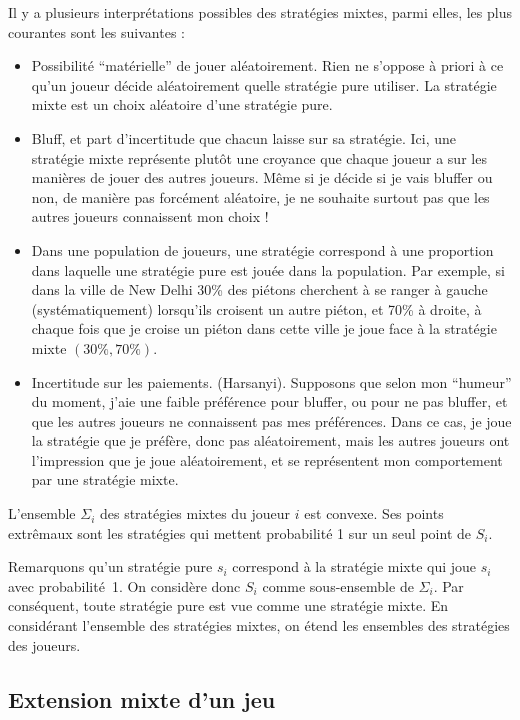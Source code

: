 Il y a plusieurs interprétations possibles des stratégies mixtes,
parmi elles, les plus courantes sont les suivantes :
\begin{itemize}
\item Possibilit\'e ``mat\'erielle'' de jouer al\'eatoirement.
Rien ne s'oppose à priori à ce qu'un joueur décide aléatoirement
quelle stratégie pure utiliser. La stratégie mixte est un choix
aléatoire d'une stratégie pure.%
\item Bluff, et part d'incertitude que chacun laisse sur sa
strat\'egie. Ici, une stratégie mixte représente plutôt une
croyance que chaque joueur a sur les manières de jouer des autres
joueurs. Même si je décide si je vais bluffer ou non, de manière
pas forcément aléatoire, je ne souhaite surtout pas que les
autres joueurs connaissent mon choix !%
\item Dans une population de joueurs, une strat\'egie
correspond à une proportion dans laquelle une stratégie pure est
jouée dans la population. Par exemple, si dans la ville de New
Delhi 30\% des piétons cherchent à se ranger à gauche
(systématiquement) lorsqu'ils croisent un autre piéton, et 70\% à
droite, à chaque fois que je croise un piéton dans cette ville je
joue face à la stratégie mixte $(30\%,70\%)$.%
\item Incertitude sur les paiements. (Harsanyi). Supposons que
selon mon ``humeur'' du moment, j'aie une faible préférence pour
bluffer, ou pour ne pas bluffer, et que les autres joueurs ne
connaissent pas mes préférences. Dans ce cas, je joue la stratégie
que je préfère, donc pas aléatoirement, mais les autres joueurs
ont l'impression que je joue aléatoirement, et se représentent mon
comportement par une stratégie mixte.
\end{itemize}

\begin{proposition}
L'ensemble $\Sigma_i$ des stratégies mixtes du joueur $i$ est
convexe. Ses points extr\^emaux sont les stratégies qui mettent
probabilité 1 sur
un seul point de $S_i$. %
\end{proposition}

Remarquons qu'un strat\'egie pure $s_i$ correspond \`a la
strat\'egie mixte qui joue $s_i$ avec probabilit\'e~1. On
considère donc $S_i$ comme sous-ensemble de $\Sigma_i$. Par
conséquent, toute stratégie pure est vue comme une stratégie
mixte. En considérant l'ensemble des stratégies mixtes, on étend
les ensembles des stratégies des joueurs.

\subsection{Extension mixte d'un jeu}

